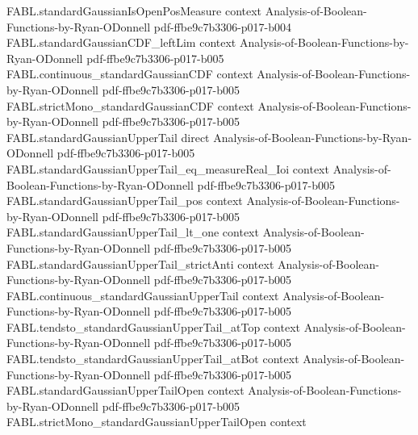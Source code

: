 \begin{theorem}
\label{FABL.gaussianIsoperimetric_isEquivalent_probability_mul_quantile}
\leanok
{}
\proofstep
  {FABL.standardGaussianIsOpenPosMeasure}
  {context}
  {Analysis-of-Boolean-Functions-by-Ryan-ODonnell}
  {pdf-ffbe9c7b3306-p017-b004}
\proofstep
  {FABL.standardGaussianCDF_leftLim}
  {context}
  {Analysis-of-Boolean-Functions-by-Ryan-ODonnell}
  {pdf-ffbe9c7b3306-p017-b005}
\proofstep
  {FABL.continuous_standardGaussianCDF}
  {context}
  {Analysis-of-Boolean-Functions-by-Ryan-ODonnell}
  {pdf-ffbe9c7b3306-p017-b005}
\proofstep
  {FABL.strictMono_standardGaussianCDF}
  {context}
  {Analysis-of-Boolean-Functions-by-Ryan-ODonnell}
  {pdf-ffbe9c7b3306-p017-b005}
\proofstep
  {FABL.standardGaussianUpperTail}
  {direct}
  {Analysis-of-Boolean-Functions-by-Ryan-ODonnell}
  {pdf-ffbe9c7b3306-p017-b005}
\proofstep
  {FABL.standardGaussianUpperTail_eq_measureReal_Ioi}
  {context}
  {Analysis-of-Boolean-Functions-by-Ryan-ODonnell}
  {pdf-ffbe9c7b3306-p017-b005}
\proofstep
  {FABL.standardGaussianUpperTail_pos}
  {context}
  {Analysis-of-Boolean-Functions-by-Ryan-ODonnell}
  {pdf-ffbe9c7b3306-p017-b005}
\proofstep
  {FABL.standardGaussianUpperTail_lt_one}
  {context}
  {Analysis-of-Boolean-Functions-by-Ryan-ODonnell}
  {pdf-ffbe9c7b3306-p017-b005}
\proofstep
  {FABL.standardGaussianUpperTail_strictAnti}
  {context}
  {Analysis-of-Boolean-Functions-by-Ryan-ODonnell}
  {pdf-ffbe9c7b3306-p017-b005}
\proofstep
  {FABL.continuous_standardGaussianUpperTail}
  {context}
  {Analysis-of-Boolean-Functions-by-Ryan-ODonnell}
  {pdf-ffbe9c7b3306-p017-b005}
\proofstep
  {FABL.tendsto_standardGaussianUpperTail_atTop}
  {context}
  {Analysis-of-Boolean-Functions-by-Ryan-ODonnell}
  {pdf-ffbe9c7b3306-p017-b005}
\proofstep
  {FABL.tendsto_standardGaussianUpperTail_atBot}
  {context}
  {Analysis-of-Boolean-Functions-by-Ryan-ODonnell}
  {pdf-ffbe9c7b3306-p017-b005}
\proofstep
  {FABL.standardGaussianUpperTailOpen}
  {context}
  {Analysis-of-Boolean-Functions-by-Ryan-ODonnell}
  {pdf-ffbe9c7b3306-p017-b005}
\proofstep
  {FABL.strictMono_standardGaussianUpperTailOpen}
  {context}

\end{theorem}
